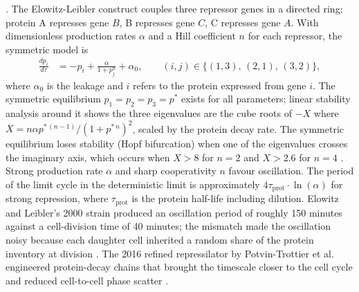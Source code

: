 . The Elowitz-Leibler
construct couples three repressor genes in a directed ring: protein
A represses gene $B$, B represses gene $C$, C represses gene $A$.
With dimensionless production rates $\alpha$ and a Hill coefficient
$n$ for each repressor, the symmetric model is
\begin{align*}
\frac{dp_{i}}{d\tau} &= -p_{i} + \frac{\alpha}{1 + p_{j}^{n}} + \alpha_{0},
\qquad (i, j) \in \{(1,3),\,(2,1),\,(3,2)\},
\end{align*}
where $\alpha_{0}$ is the leakage and $i$ refers to the protein
expressed from gene $i$. The symmetric equilibrium
$p_{1} = p_{2} = p_{3} = p^{*}$ exists for all parameters; linear
stability analysis around it shows the three eigenvalues are the
cube roots of $-X$ where
$X = n \alpha p^{*\,(n-1)} / (1 + p^{*\,n})^{2}$, scaled by the protein
decay rate. The symmetric equilibrium loses stability (Hopf
bifurcation) when one of the eigenvalues crosses the imaginary axis,
which occurs when $X > 8$ for $n = 2$ and $X > 2.6$ for $n = 4$
\cite[pp.~336--337]{paper:v6c09-elowitz-leibler-2000}. Strong
production rate $\alpha$ and sharp cooperativity $n$ favour
oscillation. The period of the limit cycle in the deterministic
limit is approximately $4\tau_{\text{prot}} \cdot \ln(\alpha)$ for
strong repression, where $\tau_{\text{prot}}$ is the protein half-life
including dilution. Elowitz and Leibler's 2000 strain produced an
oscillation period of roughly 150 minutes against a cell-division
time of 40 minutes; the mismatch made the oscillation noisy because
each daughter cell inherited a random share of the protein
inventory at division
\cite[p.~337]{paper:v6c09-elowitz-leibler-2000}. The 2016 refined
repressilator by Potvin-Trottier et al. engineered protein-decay
chains that brought the timescale closer to the cell cycle and
reduced cell-to-cell phase scatter
\cite[pp.~94--95]{paper:v6c09-potvin-trottier-repressilator-2016}.


